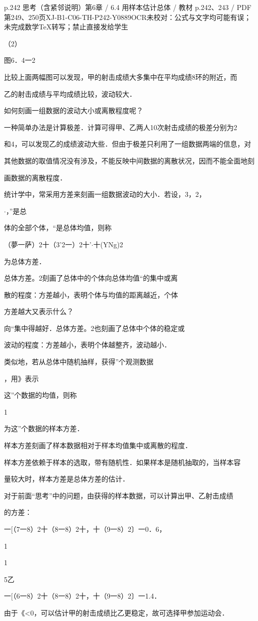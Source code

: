 \begin{bankitem}{p.242 思考（含紧邻说明）}{第6章 / 6.4 用样本估计总体 / 教材 p.242、243 / PDF 第249、250页}{XJ-B1-C06-TH-P242-Y0889}{OCR未校对：公式与文字均可能有误；未完成数学TeX转写；禁止直接发给学生}
\begin{ocrdraft}
\par
（2）
\par
图6．4一2
\par
比较上面两幅图可以发现，甲的射击成绩大多集中在平均成绩8环的附近，而
\par
乙的射击成绩与平均成绩比较，波动较大．
\par
如何刻画一组数据的波动大小或离散程度呢？
\par
[教材p.243 / PDF第250页]
\par
一种简单办法是计算极差．计算可得甲、乙两人10次射击成绩的极差分别为2
\par
和4，可以发现乙的成绩波动大些．但由于极差只利用了一组数据两端的信息，对
\par
其他数据的取值情况没有涉及，不能反映中间数据的离散状况，因而不能全面地刻
\par
画数据的离散程度．
\par
统计学中，常采用方差来刻画一组数据波动的大小．若设，3，2，
\par
\ensuremath{\cdot}，”是总
\par
体的全部个体，“是总体均值，则称
\par
（夢一萨）2十（3'2一）2十'\ensuremath{\cdot}十(YNg)2
\par
为总体方差．
\par
总体方差。2刻画了总体中的个体向总体均值“的集中或离
\par
散的程度：方差越小，表明个体与均值的距离越近，个体
\par
方差越大又表示什么？
\par
向“集中得越好．总体方差。2也刻画了总体中个体的稳定或
\par
波动的程度：方差越小，表明个体越整齐，波动越小．
\par
类似地，若从总体中随机抽样，获得”个观测数据
\par
，用》表示
\par
这”个数据的均值，则称
\par
1
\par
为这”个数据的样本方差．
\par
样本方差刻画了样本数据相对于样本均值集中或离散的程度．
\par
样本方差依赖于样本的选取，带有随机性．如果样本是随机抽取的，当样本容
\par
量较大时，样本方差是总体方差的估计．
\par
对于前面“思考”中的问题，由获得的样本数据，可以计算出甲、乙射击成绩
\par
的方差：
\par
一[（7一8）2十（8一8）2十，十（9一8）2〕一0．6，
\par
1
\par
1
\par
5乙
\par
一[（6一8）2十（8一8）2十，十（9一8）2〕一1.4．
\par
由于《<0，可以估计甲的射击成绩比乙更稳定，故可选择甲参加运动会．
\end{ocrdraft}
\end{bankitem}
